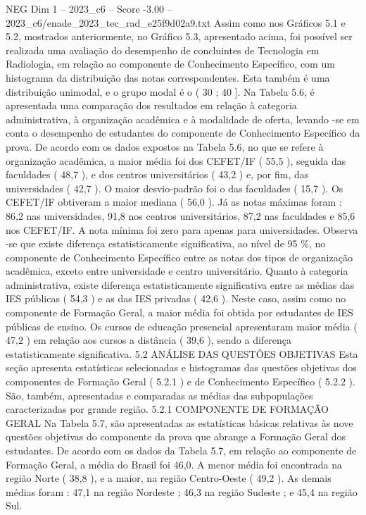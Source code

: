 \begin{textsample}{NEG Dim 1 – 2023\_c6 – Score -3.00 – 2023\_c6/enade\_2023\_tec\_rad\_e25f9d02a9.txt}
Assim como nos Gráficos 5.1 e 5.2, mostrados anteriormente, no Gráfico 5.3, apresentado acima, foi possível ser realizada uma avaliação do desempenho de concluintes de Tecnologia em Radiologia, em relação ao componente de Conhecimento Específico, com um histograma da distribuição das notas correspondentes.
Esta também é uma distribuição unimodal, e o grupo modal é o ( 30 ; 40 ].
Na Tabela 5.6, é apresentada uma comparação dos resultados em relação à categoria administrativa, à organização acadêmica e à modalidade de oferta, levando -se em conta o desempenho de estudantes do componente de Conhecimento Específico da prova.
De acordo com os dados expostos na Tabela 5.6, no que se refere à organização acadêmica, a maior média foi dos CEFET/IF ( 55,5 ), seguida das faculdades ( 48,7 ), e dos centros universitários ( 43,2 ) e, por fim, das universidades ( 42,7 ).
O maior desvio-padrão foi o das faculdades ( 15,7 ).
Os CEFET/IF obtiveram a maior mediana ( 56,0 ).
Já as notas máximas foram : 86,2 nas universidades, 91,8 nos centros universitários, 87,2 nas faculdades e 85,6 nos CEFET/IF.
A nota mínima foi zero para apenas para universidades.
Observa -se que existe diferença estatisticamente significativa, ao nível de 95 \%, no componente de Conhecimento Específico entre as notas dos tipos de organização acadêmica, exceto entre universidade e centro universitário.
Quanto à categoria administrativa, existe diferença estatisticamente significativa entre as médias das IES públicas ( 54,3 ) e as das IES privadas ( 42,6 ).
Neste caso, assim como no componente de Formação Geral, a maior média foi obtida por estudantes de IES públicas de ensino.
Os cursos de educação presencial apresentaram maior média ( 47,2 ) em relação aos cursos a distância ( 39,6 ), sendo a diferença estatisticamente significativa. 5.2 ANÁLISE DAS QUESTÕES OBJETIVAS Esta seção apresenta estatísticas selecionadas e histogramas das questões objetivas dos componentes de Formação Geral ( 5.2.1 ) e de Conhecimento Específico ( 5.2.2 ).
São, também, apresentadas e comparadas as médias das subpopulações caracterizadas por grande região. 5.2.1 COMPONENTE DE FORMAÇÃO GERAL Na Tabela 5.7, são apresentadas as estatísticas básicas relativas às nove questões objetivas do componente da prova que abrange a Formação Geral dos estudantes.
De acordo com os dados da Tabela 5.7, em relação ao componente de Formação Geral, a média do Brasil foi 46,0.
A menor média foi encontrada na região Norte ( 38,8 ), e a maior, na região Centro-Oeste ( 49,2 ).
As demais médias foram : 47,1 na região Nordeste ; 46,3 na região Sudeste ; e 45,4 na região Sul.

\end{textsample}
